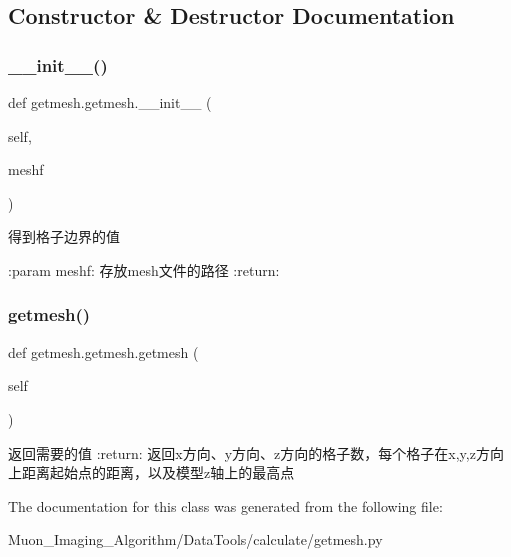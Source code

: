 \subsection{Constructor \& Destructor Documentation}
\mbox{\label{classgetmesh_1_1getmesh_a67514ad6c427b8da4c6bbd1bc58ecb08}} 
\subsubsection{\texorpdfstring{\+\_\+\+\_\+init\+\_\+\+\_\+()}{\_\_init\_\_()}}
{\footnotesize\ttfamily def getmesh.\+getmesh.\+\_\+\+\_\+init\+\_\+\+\_\+ (\begin{DoxyParamCaption}\item[{}]{self,  }\item[{}]{meshf }\end{DoxyParamCaption})}

\begin{DoxyVerb}得到格子边界的值

:param meshf: 存放mesh文件的路径
:return:
\end{DoxyVerb}
 \mbox{\label{classgetmesh_1_1getmesh_a82dfe6bc8ed8d0321b58232d1e9d1a6a}} 
\subsubsection{\texorpdfstring{getmesh()}{getmesh()}}
{\footnotesize\ttfamily def getmesh.\+getmesh.\+getmesh (\begin{DoxyParamCaption}\item[{}]{self }\end{DoxyParamCaption})}

\begin{DoxyVerb}返回需要的值
:return: 返回x方向、y方向、z方向的格子数，每个格子在x,y,z方向上距离起始点的距离，以及模型z轴上的最高点
\end{DoxyVerb}
 

The documentation for this class was generated from the following file\+:\begin{DoxyCompactItemize}
\item 
Muon\+\_\+\+Imaging\+\_\+\+Algorithm/\+Data\+Tools/calculate/getmesh.\+py\end{DoxyCompactItemize}

